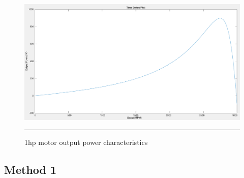 \begin{figure}[hbtp!]
	\centering
		\includegraphics[width = 4.5in]{./Figures/MS/fig53.png}
		\rule{35em}{0.5pt}
	\caption{1hp motor output power characteristics}
	\label{fig:1hp motor output power characteristics} 
\end{figure}

\clearpage
\subsection{Method 1}
